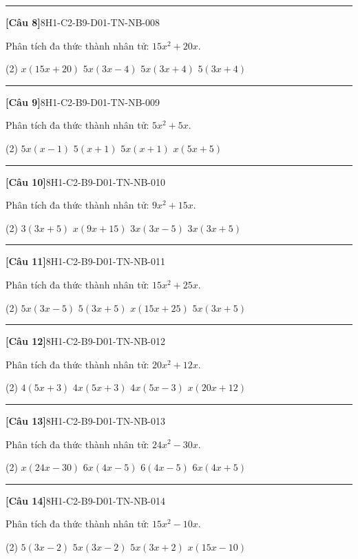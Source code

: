 \documentclass[12pt,a4paper]{article}
\newif\ifloigiai
\newenvironment{cauhoi}[2]{%
  \par\medskip\noindent\rule{\textwidth}{0.4pt}\par\nopagebreak
  \noindent\textbf{[#1]}\hfill{\scriptsize\ttfamily #2}\par\nopagebreak\smallskip}{\par}
\newcommand{\dapan}[1]{\ifloigiai\par\smallskip\noindent\textit{Đáp án:} \textbf{#1}\par\fi}
\begin{document}
\begin{cauhoi}{Câu 8}{8H1-C2-B9-D01-TN-NB-008}
Phân tích đa thức thành nhân tử: $15x^{2} + 20x$.
\begin{tasks}(2)
\task $x(15x + 20)$
\task $5x(3x - 4)$
\task $5x(3x + 4)$
\task $5(3x + 4)$
\end{tasks}
\dapan{C}
\end{cauhoi}
\begin{cauhoi}{Câu 9}{8H1-C2-B9-D01-TN-NB-009}
Phân tích đa thức thành nhân tử: $5x^{2} + 5x$.
\begin{tasks}(2)
\task $5x(x - 1)$
\task $5(x + 1)$
\task $5x(x + 1)$
\task $x(5x + 5)$
\end{tasks}
\dapan{C}
\end{cauhoi}
\begin{cauhoi}{Câu 10}{8H1-C2-B9-D01-TN-NB-010}
Phân tích đa thức thành nhân tử: $9x^{2} + 15x$.
\begin{tasks}(2)
\task $3(3x + 5)$
\task $x(9x + 15)$
\task $3x(3x - 5)$
\task $3x(3x + 5)$
\end{tasks}
\dapan{D}
\end{cauhoi}
\begin{cauhoi}{Câu 11}{8H1-C2-B9-D01-TN-NB-011}
Phân tích đa thức thành nhân tử: $15x^{2} + 25x$.
\begin{tasks}(2)
\task $5x(3x - 5)$
\task $5(3x + 5)$
\task $x(15x + 25)$
\task $5x(3x + 5)$
\end{tasks}
\dapan{D}
\end{cauhoi}
\begin{cauhoi}{Câu 12}{8H1-C2-B9-D01-TN-NB-012}
Phân tích đa thức thành nhân tử: $20x^{2} + 12x$.
\begin{tasks}(2)
\task $4(5x + 3)$
\task $4x(5x + 3)$
\task $4x(5x - 3)$
\task $x(20x + 12)$
\end{tasks}
\dapan{B}
\end{cauhoi}
\begin{cauhoi}{Câu 13}{8H1-C2-B9-D01-TN-NB-013}
Phân tích đa thức thành nhân tử: $24x^{2} - 30x$.
\begin{tasks}(2)
\task $x(24x - 30)$
\task $6x(4x - 5)$
\task $6(4x - 5)$
\task $6x(4x + 5)$
\end{tasks}
\dapan{B}
\end{cauhoi}
\begin{cauhoi}{Câu 14}{8H1-C2-B9-D01-TN-NB-014}
Phân tích đa thức thành nhân tử: $15x^{2} - 10x$.
\begin{tasks}(2)
\task $5(3x - 2)$
\task $5x(3x - 2)$
\task $5x(3x + 2)$
\task $x(15x - 10)$
\end{tasks}
\dapan{B}
\end{cauhoi}
\end{document}
